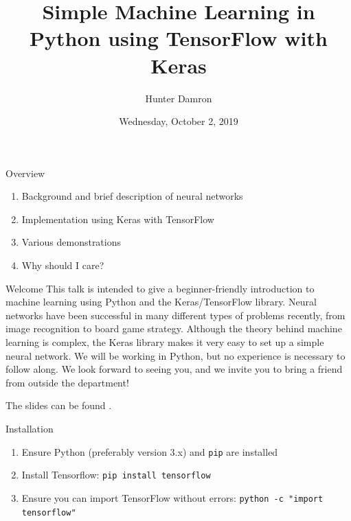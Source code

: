 \documentclass{beamer}
\title{Simple Machine Learning in Python using TensorFlow with Keras}
\author{Hunter Damron}
\date{Wednesday, October 2, 2019}
\institute[UofSC ACM]{Association for Computing Machinery -- University of South Carolina}
\newcommand{\blue}[1]{\color{blue}{#1}}
\begin{document}
	\maketitle

	\begin{frame}{Overview}
		\begin{enumerate}
			\item Background and brief description of neural networks
			\item Implementation using Keras with TensorFlow
			\item Various demonstrations
			\item Why should I care?
		\end{enumerate}
	\end{frame}

	\begin{frame}{Welcome}
		This talk is intended to give a beginner-friendly introduction to machine learning using Python and the Keras/TensorFlow library. Neural networks have been successful in many different types of problems recently, from image recognition to board game strategy. Although the theory behind machine learning is complex, the Keras library makes it very easy to set up a simple neural network. We will be working in Python, but no experience is necessary to follow along. We look forward to seeing you, and we invite you to bring a friend from outside the department!

		The slides can be found \href{https://github.com/hdamron17/ACM_Machine_Learning_Talk/releases/}{\blue{here}}.
	\end{frame}

	\begin{frame}{Installation}
		\begin{enumerate}
			\item Ensure Python (preferably version 3.x) and \lstinline|pip| are installed
			\item Install Tensorflow: \lstinline|pip install tensorflow|
			\item Ensure you can import TensorFlow without errors: \lstinline|python -c "import tensorflow"|
		\end{enumerate}
	\end{frame}
\end{document}
